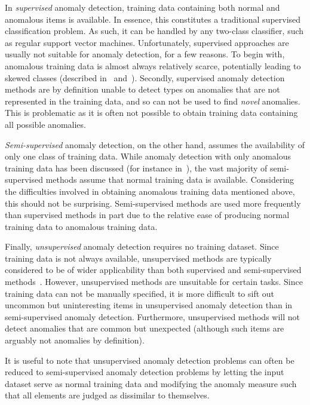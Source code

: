 In \emph{supervised} anomaly detection, training data containing both normal and anomalous items is available. In essence, this constitutes a traditional supervised classification problem. As such, it can be handled by any two-class classifier, such as regular support vector machines. Unfortunately, supervised approaches are usually not suitable for anomaly detection, for a few reasons. To begin with, anomalous training data is almost always relatively scarce, potentially leading to skewed classes (described in~\cite{phua} and~\cite{joshi}). Secondly, supervised anomaly detection methods are by definition unable to detect types on anomalies that are not represented in the training data, and so can not be used to find \emph{novel} anomalies. This is problematic as it is often not possible to obtain training data containing all possible anomalies.

\emph{Semi-supervised} anomaly detection, on the other hand, assumes the availability of only one class of training data. While anomaly detection with only anomalous training data has been discussed (for instance in~\cite{dasgupta}), the vast majority of semi-supervised methods assume that normal training data is available. Considering the difficulties involved in obtaining anomalous training data mentioned above, this should not be surprising. Semi-supervised methods are used more frequently than supervised methods in part due to the relative ease of producing normal training data to anomalous training data.

Finally, \emph{unsupervised} anomaly detection requires no training dataset. Since training data is not always available, unsupervised methods are typically considered to be of wider applicability than both supervised and semi-supervised methods~\cite{chandola}. However, unsupervised methods are unsuitable for certain tasks. Since training data can not be manually specified, it is more difficult to sift out uncommon but uninteresting items in unsupervised anomaly detection than in semi-supervised anomaly detection. Furthermore, unsupervised methods will not detect anomalies that are common but unexpected (although such items are arguably not anomalies by definition).

It is useful to note that unsupervised anomaly detection problems can often be reduced to semi-supervised anomaly detection problems by letting the input dataset serve as normal training data and modifying the anomaly measure such that all elements are judged as dissimilar to themselves.

